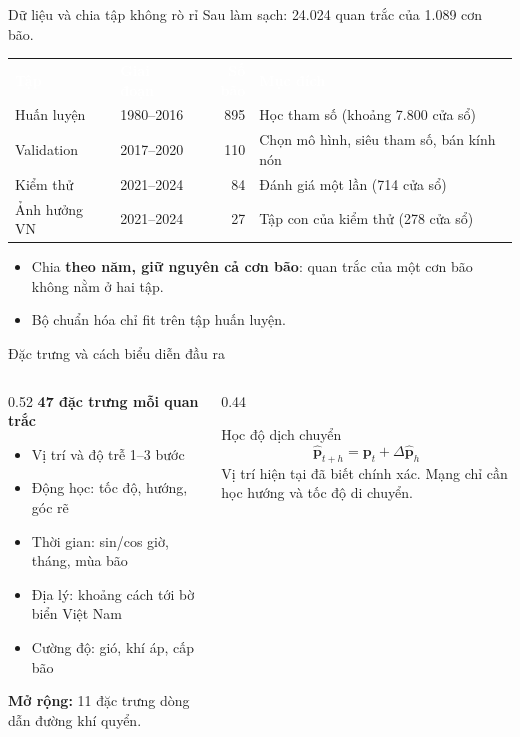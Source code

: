 \documentclass[aspectratio=169, 11pt, xcolor={table}]{beamer}
\newcommand{\dauBang}{\rowcolor{daunavy}}
\newcommand{\tb}[1]{\textcolor{white}{\textbf{#1}}}
\begin{document}
\begin{frame}{Dữ liệu và chia tập không rò rỉ}
  Sau làm sạch: \alert{24.024 quan trắc của 1.089 cơn bão}.
  \vspace{0.4em}

  \centering
  \begin{tabular}{llrl}
    \dauBang
    \tb{Tập} & \tb{Giai đoạn} & \tb{Số bão} & \tb{Mục đích} \\
    Huấn luyện   & 1980--2016 & 895 & Học tham số (khoảng 7.800 cửa sổ) \\
    Validation   & 2017--2020 & 110 & Chọn mô hình, siêu tham số, bán kính nón \\
    Kiểm thử     & 2021--2024 & 84  & Đánh giá một lần (714 cửa sổ) \\
    Ảnh hưởng VN & 2021--2024 & 27  & Tập con của kiểm thử (278 cửa sổ) \\
    \bottomrule
  \end{tabular}

  \vspace{0.6em}
  \raggedright
  \begin{itemize}
    \item Chia \textbf{theo năm, giữ nguyên cả cơn bão}: quan trắc của một cơn
          bão không nằm ở hai tập.
    \item Bộ chuẩn hóa chỉ fit trên tập huấn luyện.
  \end{itemize}
\end{frame}

\begin{frame}{Đặc trưng và cách biểu diễn đầu ra}
  \begin{columns}[T]
    \begin{column}{0.52\textwidth}
      \textbf{47 đặc trưng mỗi quan trắc}
      \begin{itemize}
        \item Vị trí và độ trễ 1--3 bước
        \item Động học: tốc độ, hướng, góc rẽ
        \item Thời gian: sin/cos giờ, tháng, mùa bão
        \item Địa lý: khoảng cách tới bờ biển Việt Nam
        \item Cường độ: gió, khí áp, cấp bão
      \end{itemize}
      \textbf{Mở rộng:} 11 đặc trưng dòng dẫn đường khí quyển.
    \end{column}
    \begin{column}{0.44\textwidth}
      \begin{block}{Học độ dịch chuyển}
        \[
          \hat{\mathbf{p}}_{t+h} = \mathbf{p}_t + \Delta\hat{\mathbf{p}}_h
        \]
        Vị trí hiện tại đã biết chính xác. Mạng chỉ cần học hướng và tốc độ
        di chuyển.
      \end{block}
    \end{column}
  \end{columns}
\end{frame}
\end{document}
